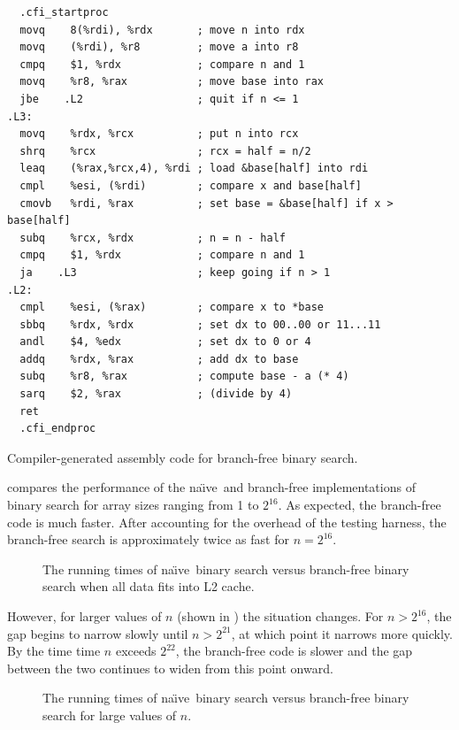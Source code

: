\documentclass{patmorin}
\newcommand{\lstlabel}[1]{\label{lst:#1}}
\newcommand{\naive}{na\"{\i}ve}
\begin{document}
\begin{listing}
\begin{verbatim}
  .cfi_startproc
  movq    8(%rdi), %rdx       ; move n into rdx
  movq    (%rdi), %r8         ; move a into r8
  cmpq    $1, %rdx            ; compare n and 1
  movq    %r8, %rax           ; move base into rax
  jbe    .L2                  ; quit if n <= 1
.L3:
  movq    %rdx, %rcx          ; put n into rcx
  shrq    %rcx                ; rcx = half = n/2
  leaq    (%rax,%rcx,4), %rdi ; load &base[half] into rdi
  cmpl    %esi, (%rdi)        ; compare x and base[half]
  cmovb   %rdi, %rax          ; set base = &base[half] if x > base[half]
  subq    %rcx, %rdx          ; n = n - half
  cmpq    $1, %rdx            ; compare n and 1
  ja    .L3                   ; keep going if n > 1
.L2:
  cmpl    %esi, (%rax)        ; compare x to *base
  sbbq    %rdx, %rdx          ; set dx to 00..00 or 11...11
  andl    $4, %edx            ; set dx to 0 or 4 
  addq    %rdx, %rax          ; add dx to base
  subq    %r8, %rax           ; compute base - a (* 4)
  sarq    $2, %rax            ; (divide by 4)
  ret
  .cfi_endproc
\end{verbatim}
\caption{Compiler-generated assembly code for branch-free binary search.}
\lstlabel{bfbs-asm}
\end{listing}

 compares the performance of the \naive\ and
branch-free implementations of binary search for array sizes 
ranging from 1 to $2^{16}$.  As expected, the branch-free code is much
faster. After accounting for the overhead of the testing harness, the
branch-free search is approximately twice as fast for $n=2^{16}$.

\begin{figure}
   \caption{The running times of \naive\ binary search versus
    branch-free binary search when all data
    fits into L2 cache.}
\end{figure}

However, for larger values of $n$ (shown in ) the
situation changes.  For $n>2^{16}$, the gap begins to narrow slowly
until $n>2^{21}$, at which point it narrows more quickly.  By the time
time $n$ exceeds $2^{22}$, the branch-free code is slower and the gap
between the two continues to widen from this point onward.

\begin{figure}
   \caption{The running times of \naive\ binary search versus
    branch-free binary search for large values of $n$.}
\end{figure}
\end{document}

